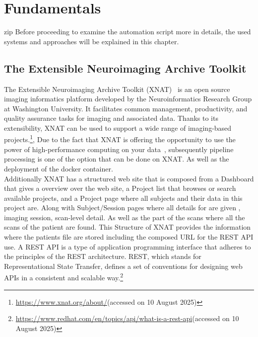 
\chapter{Fundamentals}
zip
Before proceeding to examine the automation script more in details, the used systems and approaches will be explained in this chapter.

\section{The Extensible Neuroimaging Archive Toolkit}
The Extensible Neuroimaging Archive Toolkit (XNAT)~\cite{marcus_extensible_2007} is an open source imaging informatics platform developed by the Neuroinformatics Research Group at Washington University. It facilitates common management, productivity, and quality assurance tasks for imaging and associated data. Thanks to its extensibility, XNAT can be used to support a wide range of imaging-based projects.\footnote{\url{https://www.xnat.org/about/}(accessed on 10 August 2025)}, Due to the fact that XNAT is offering the opportunity to use the power of high-performance computing on your data~\cite{zaschke_extending_2024}, 
subsequently pipeline processing is one of the option that can be done on XNAT. As well as the deployment of the docker container.
\\
Additionally XNAT has a structured web site that is composed from a Dashboard that gives a overview over the web site, a Project list that browses or search available projects, and a Project page where all subjects and their data in this project are. Along with Subject/Session pages where all details for are given , imaging session, scan-level detail.
As well as the part of the scans where all the scans of the patient are found. 
This Structure of XNAT provides the information where the patients file are stored including the composed URL for the REST API use. A REST API is a type of application programming interface that adheres to the principles of the REST architecture. REST, which stands for Representational State Transfer, defines a set of conventions for designing web APIs in a consistent and scalable way.\footnote{\url{https://www.redhat.com/en/topics/api/what-is-a-rest-api}(accessed on 10 August 2025)}
\\
